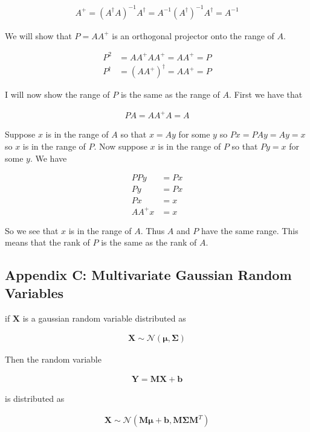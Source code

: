 \documentclass[12pt]{article}
\newcommand{\bv}[1]{\boldsymbol{#1}}
\begin{document}
\begin{align}
A^+ = (A^{\dag}A)^{-1}A^{\dag} = A^{-1}(A^{\dag})^{-1} A^{\dag} = A^{-1}
\end{align}

We will show that $P = A A^+$ is an orthogonal projector onto the range of $A$.

\begin{align}
P^2 &= AA^+AA^+ = AA^+ = P\\
P^{\dag} &= (AA^+)^{\dag} = AA^+ = P
\end{align}

I will now show the range of $P$ is the same as the range of $A$. First we have that

\begin{align}
PA = AA^+A = A
\end{align}

Suppose $x$ is in the range of $A$ so that $x = Ay$ for some $y$ so $Px = PAy = Ay = x$ so $x$ is in the range of $P$. Now suppose $x$ is in the range of $P$ so that $Py=x$ for some $y$. We have

\begin{align}
PPy &= Px\\
Py &= Px\\
Px &= x\\
AA^+x &= x
\end{align}

So we see that $x$ is in the range of $A$. Thus $A$ and $P$ have the same range. This means that the rank of $P$ is the same as the rank of $A$.

\subsection{Appendix C: Multivariate Gaussian Random Variables}

if $\bv{X}$ is a gaussian random variable distributed as

\begin{align}
\bv{X} \sim \mathcal{N}(\bv{\mu}, \bv{\Sigma})
\end{align}

Then the random variable

\begin{align}
\bv{Y} = \bv{M}\bv{X} + \bv{b}
\end{align}

is distributed as

\begin{align}
\bv{X} \sim \mathcal{N}(\bv{M}\bv{\mu} + \bv{b}, \bv{M}\bv{\Sigma}\bv{M}^T)
\end{align}
\end{document}
